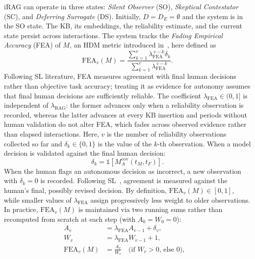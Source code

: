 \documentclass[a4paper,twoside]{article}
\begin{document}
iRAG can operate in three states: \textit{Silent Observer} (SO), \textit{Skeptical Contestator} (SC), and \textit{Deferring Surrogate} (DS). Initially, $D=D_E=\emptyset$ and the system is in the SO state. The KB, its embeddings, the reliability estimate, and the current state persist across interactions.
The system tracks the \textit{Fading Empirical Accuracy} (FEA) of $M$,
an HDM metric introduced in~\cite{pellungrini2025bridging}, 
here defined as
\begin{equation}
\mathrm{FEA}_v(M)
=
\frac{
    \sum_{k=1}^{v}\lambda_{\mathrm{FEA}}^{\,v-k}\delta_k
}{
    \sum_{k=1}^{v}\lambda_{\mathrm{FEA}}^{\,v-k}
}.
\end{equation}
Following SL literature, FEA measures agreement with final human decisions rather than objective task accuracy; treating it as evidence for autonomy assumes that final human decisions are sufficiently reliable. The coefficient $\lambda_{\mathrm{FEA}}\in(0,1]$ is independent of $\lambda_{\mathrm{RAG}}$: the former advances only when a reliability observation is recorded, whereas the latter advances at every KB insertion and periods without human validation do not alter FEA, which fades across observed evidence rather than elapsed interactions.
Here, $v$ is the number of reliability observations collected so far and $\delta_k\in\{0,1\}$ is the value of the $k$-th observation. When a model decision is validated against the final human decision:
\begin{equation}
\delta_k
=
\mathbb{1}
\left[
M_A^{\mathrm{cov}}(t_M,t_F)
\right].
\end{equation}
When the human flags an autonomous decision as incorrect, a new observation with $\delta_k=0$ is recorded. Following SL~\cite{zeni2019fixing,pellungrini2025bridging,Mazzoni2024frank}, agreement is measured against the human's final, possibly revised decision. By definition, $\mathrm{FEA}_v(M)\in[0,1]$, while smaller values of $\lambda_{\mathrm{FEA}}$ assign progressively less weight to older observations. In practice, $\mathrm{FEA}_v(M)$ is maintained via two running sums rather than recomputed from scratch at each step (with $A_0=W_0=0$):
\begin{equation}
\begin{aligned}
A_v &= \lambda_{\mathrm{FEA}} A_{v-1}+\delta_v, & \\
W_v &= \lambda_{\mathrm{FEA}} W_{v-1}+1, \\
\mathrm{FEA}_v(M) &= \frac{A_v}{W_v}
\quad \text{(if $W_v>0$, else $0$)},
\end{aligned}
\end{equation}
\end{document}
